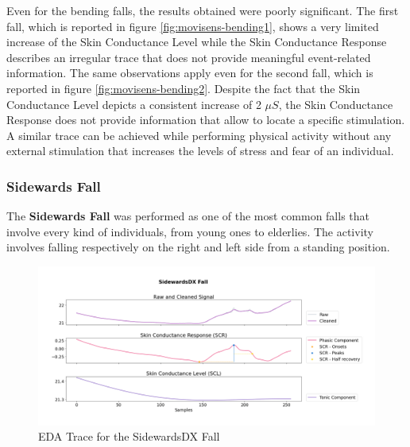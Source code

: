 \vspace{15mm}
Even for the bending falls, the results obtained were poorly significant. The first fall, which is reported in figure \ref{fig:movisens-bending1}, shows a very limited increase of the Skin Conductance Level while the Skin Conductance Response describes an irregular trace that does not provide meaningful event-related information. The same observations apply even for the second fall, which is reported in figure \ref{fig:movisens-bending2}. Despite the fact that the Skin Conductance Level depicts a consistent increase of 2 $\mu S$, the Skin Conductance Response does not provide information that allow to locate a specific stimulation. A similar trace can be achieved while performing physical activity without any external stimulation that increases the levels of stress and fear of an individual.

\newpage

\subsubsection{Sidewards Fall}\label{subsubsec:sidewards-fall}

The \textbf{Sidewards Fall} was performed as one of the most common falls that involve every kind of individuals, from young ones to elderlies. The activity involves falling respectively on the right and left side from a standing position.

\begin{figure}[h!]
    \centering
    \includegraphics[width=\textwidth]{./images/movisens/SidewardsDX.png}
    \caption{EDA Trace for the SidewardsDX Fall}
    \label{fig:movisens-sidewardsdx}
\end{figure}

